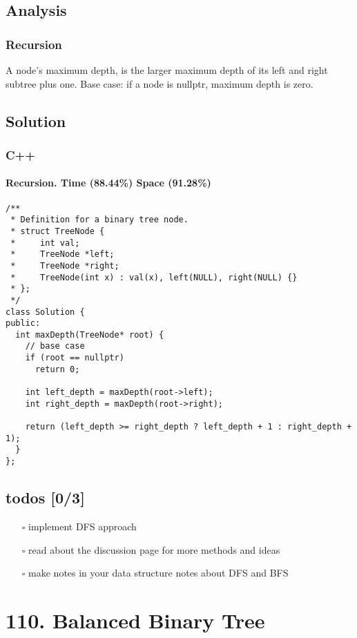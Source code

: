 \documentclass[12pt]{article}
\begin{document}
\subsection{Analysis}
\label{sec:org432bcb4}
\subsubsection{Recursion}
\label{sec:orge3e6755}
A node's maximum depth, is the larger maximum depth of its left and right subtree plus one. Base case: if a node is nullptr, maximum depth is zero.
\subsection{Solution}
\label{sec:orgbb4f5fe}
\subsubsection{C++}
\label{sec:org3d6b81d}
\paragraph{Recursion. Time (88.44\%) Space (91.28\%)}
\label{sec:org1056b56}
\begin{verbatim}
/**
 * Definition for a binary tree node.
 * struct TreeNode {
 *     int val;
 *     TreeNode *left;
 *     TreeNode *right;
 *     TreeNode(int x) : val(x), left(NULL), right(NULL) {}
 * };
 */
class Solution {
public:
  int maxDepth(TreeNode* root) {
    // base case 
    if (root == nullptr)
      return 0;

    int left_depth = maxDepth(root->left);
    int right_depth = maxDepth(root->right);

    return (left_depth >= right_depth ? left_depth + 1 : right_depth + 1);
  }
};
\end{verbatim}
\subsection{todos [0/3]}
\label{sec:org271658b}
\begin{itemize}
\item[{$\square$}] implement DFS approach
\item[{$\square$}] read about the discussion page for more methods and ideas
\item[{$\square$}] make notes in your data structure notes about DFS and BFS
\end{itemize}
\section{110. Balanced Binary Tree}
\label{sec:org61f0b50}
\end{document}
